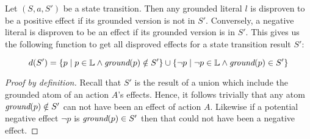 \documentclass[../Master.tex]{subfiles}
\begin{document}
\begin{theorem}
	 Let $\left(S, a, S'\right)$ be a state transition. Then any grounded literal $l$ is disproven to be a positive effect if its grounded version is not in $S'$. Conversely, a negative literal is disproven to be an effect if its grounded version is in $S'$. This gives us the following function to get all disproved effects for a state transition result $S'$:
	
	\begin{equation*}
		 d(S') = \left\{
			p \mid p \in \mathbb{L} \land \textit{ground} (p) \notin S'
			\right\} 
			\cup
			 \left\{
			\neg p \mid \neg p \in \mathbb{L} \land \textit{ground}(p) \in S'
			\right\}
	\end{equation*}
\end{theorem}
	\begin{proof}[Proof by definition]
		Recall that $S'$ is the result of a union which include the grounded atom of an action $A$'s effects. Hence, it follows trivially that any atom $\textit{ground}(p) \notin S'$ can not have been an effect of action $A$.
	Likewise if a potential negative effect $\neg p$ is $\textit{ground}(p) \in S'$ then that could not have been a negative effect.
	\end{proof}
\end{document}

